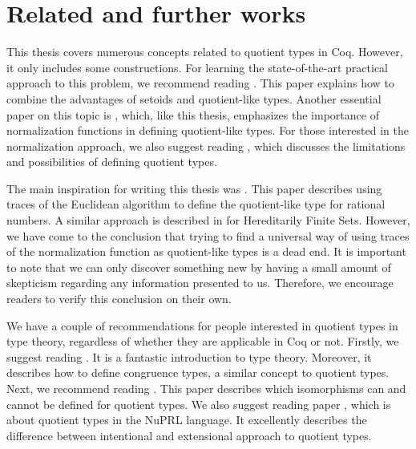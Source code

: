 \section{Related and further works}
This thesis covers numerous concepts related to quotient types in Coq. However, it only includes some constructions. For learning the state-of-the-art practical approach to this problem, we recommend reading \cite{PragmaticQT}. This paper explains how to combine the advantages of setoids and quotient-like types. Another essential paper on this topic is \cite{NormalizedTypes}, which, like this thesis, emphasizes the importance of normalization functions in defining quotient-like types. For those interested in the normalization approach, we also suggest reading \cite{DefinableQuotients}, which discusses the limitations and possibilities of defining quotient types.

The main inspiration for writing this thesis was \cite{Qplus}. This paper describes using traces of the Euclidean algorithm to define the quotient-like type for rational numbers. A similar approach is described in \cite{HereditarilyFS} for Hereditarily Finite Sets. However, we have come to the conclusion that trying to find a universal way of using traces of the normalization function as quotient-like types is a dead end. It is important to note that we can only discover something new by having a small amount of skepticism regarding any information presented to us. Therefore, we encourage readers to verify this conclusion on their own.

We have a couple of recommendations for people interested in quotient types in type theory, regardless of whether they are applicable in Coq or not. Firstly, we suggest reading \cite{DIY_TT}. It is a fantastic introduction to type theory. Moreover, it describes how to define congruence types, a similar concept to quotient types. Next, we recommend reading \cite{Quot_izo}. This paper describes which isomorphisms can and cannot be defined for quotient types. We also suggest reading paper \cite{NuPRL_quot}, which is about quotient types in the NuPRL language. It excellently describes the difference between intentional and extensional approach to quotient types.

